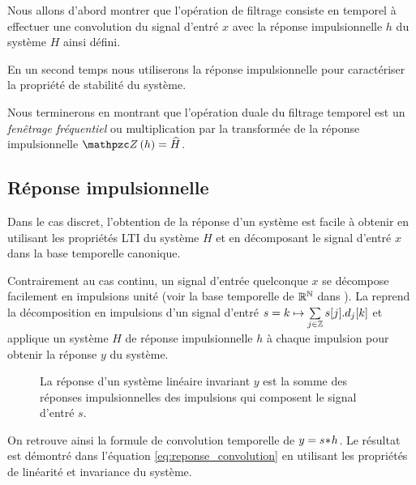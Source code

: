 Nous allons d'abord montrer que l'opération de filtrage consiste en
temporel à effectuer une convolution du signal d'entré $x$ avec la
réponse impulsionnelle $h$ du système $H$ ainsi défini.

En un second temps nous utiliserons la réponse impulsionnelle pour
caractériser la propriété de stabilité du système.

Nous terminerons en montrant que l'opération duale du filtrage
temporel est un \emph{fenêtrage fréquentiel} ou multiplication par la
transformée de la réponse impulsionnelle $\TZ\p{h}=\TZlui{H}$.

\subsection{Réponse impulsionnelle}
\label{sec:rip}
Dans le cas discret, l'obtention de la réponse d'un système est facile
à obtenir en utilisant les propriétés LTI du système $H$ et en
décomposant le signal d'entré $x$ dans la base temporelle canonique.


Contrairement au cas continu, un signal d'entrée quelconque $x$ se
décompose facilement en impulsions unité (voir la base temporelle de
$\mathbb{R}^{\mathbb{N}}$ dans ). La 
reprend la décomposition en impulsions d'un signal d'entré
$s=k\mapsto \sum\limits_{j\in\mathbb{Z}}^{}{s[j].d_j\!\left[k\right]}$ et applique un système
$H$ de réponse impulsionnelle $h$ à chaque impulsion pour obtenir la
réponse $y$ du système.

\begin{figure}[ht!]
  \centering {}
  \caption{La réponse d'un système linéaire invariant $y$ est la somme
    des réponses impulsionnelles des impulsions qui composent le
    signal d'entré $s$.}
  \label{fig:reponse_convolution}
\end{figure}

On retrouve ainsi la formule de convolution temporelle de
$y=s\!\ast\! h$. Le résultat est démontré dans l'équation
\eqref{eq:reponse_convolution} en utilisant les propriétés de
linéarité et invariance du système.


